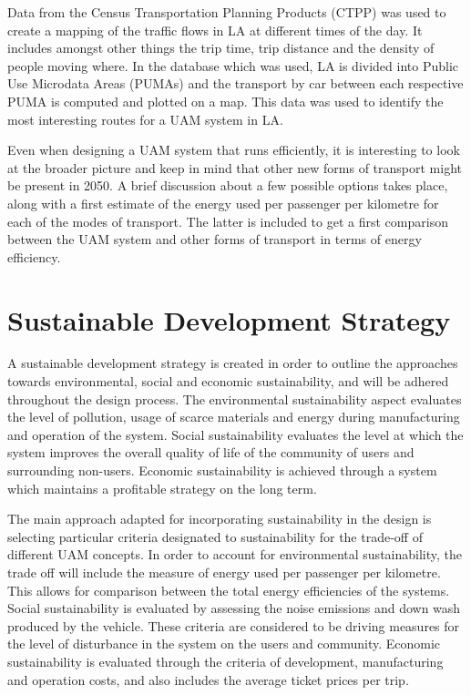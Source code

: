 Data from the Census Transportation Planning Products (CTPP) was used to create a mapping of the traffic flows in LA at different times of the day. It includes amongst other things the trip time, trip distance and the density of people moving where. In the database which was used, LA is divided into Public Use Microdata Areas (PUMAs) and the transport by car between each respective PUMA is computed and plotted on a map. This data was used to identify the most interesting routes for a UAM system in LA. 

Even when designing a UAM system that runs efficiently, it is interesting to look at the broader picture and keep in mind that other new forms of transport might be present in 2050. A brief discussion about a few possible options takes place, along with a first estimate of the energy used per passenger per kilometre for each of the modes of transport. The latter is included to get a first comparison between the UAM system and other forms of transport in terms of energy efficiency. 

\section{Sustainable Development Strategy}
A sustainable development strategy is created in order to outline the approaches towards environmental, social and economic sustainability, and will be adhered throughout the design process. The environmental sustainability aspect evaluates the level of pollution, usage of scarce materials and energy during manufacturing and operation of the system. Social sustainability evaluates the level at which the system improves the overall quality of life of the community of users and surrounding non-users. Economic sustainability is achieved through a system which maintains a profitable strategy on the long term. 

The main approach adapted for incorporating sustainability in the design is selecting particular criteria designated to sustainability for the trade-off of different UAM concepts. In order to account for environmental sustainability, the trade off will include the measure of energy used per passenger per kilometre. This allows for comparison between the total energy efficiencies of the systems. Social sustainability is evaluated by assessing the noise emissions and down wash produced by the vehicle. These criteria are considered to be driving measures for the level of disturbance in the system on the users and community. Economic sustainability is evaluated through the criteria of development, manufacturing and operation costs, and also includes the average ticket prices per trip.



